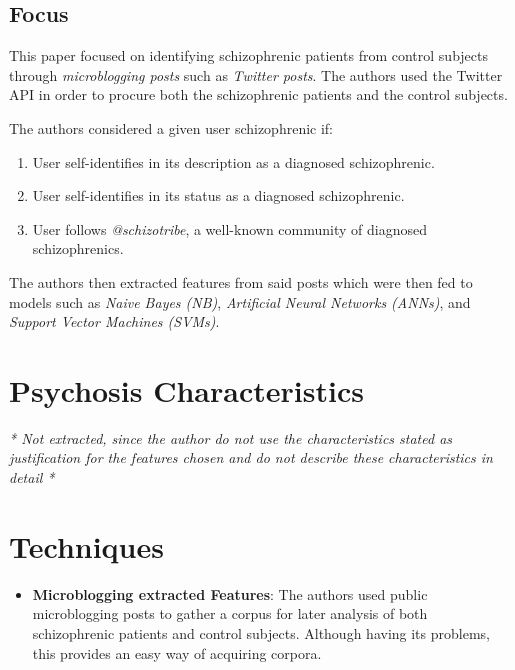 \documentclass{Paper_Summary}
\begin{document}
\makepapertitle

\breakline

\begin{center}
    \section*{Focus}
\end{center}

    This paper focused on identifying schizophrenic patients from control subjects through \emph{microblogging posts} such as \emph{Twitter posts}. The authors used the Twitter API in order to procure both the schizophrenic patients and the control subjects.

    The authors considered a given user schizophrenic if:
    \begin{enumerate}
        \item User self-identifies in its description as a diagnosed schizophrenic.
        \item User self-identifies in its status as a diagnosed schizophrenic.
        \item User follows \emph{@schizotribe}, a well-known community of diagnosed schizophrenics.
    \end{enumerate}

    The authors then extracted features from said posts which were then fed to models such as \emph{Naive Bayes (NB)}, \emph{Artificial Neural Networks (ANNs)}, and \emph{Support Vector Machines (SVMs)}.

\breakline

\newpage

\section{Psychosis Characteristics}
\emph{* Not extracted, since the author do not use the characteristics stated as justification for the features chosen and do not describe these characteristics in detail *}

\section{Techniques}
    \begin{itemize}
        \item \textbf{Microblogging extracted Features}: The authors used public microblogging posts to gather a corpus for later analysis of both schizophrenic patients and control subjects. Although having its problems, this provides an easy way of acquiring corpora.
    \end{itemize}
\end{document}
